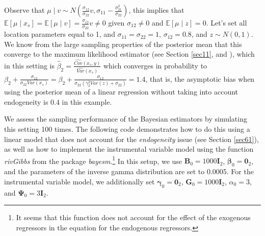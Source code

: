 Observe that $\mu\mid v\sim N\left(\frac{\sigma_{12}}{\sigma_{22}}v,\sigma_{11}-\frac{\sigma_{21}^2}{\sigma_{22}}\right)$, this implies that $\mathbb{E}[\mu\mid x_s]=\mathbb{E}[\mu\mid v]=\frac{\sigma_{12}}{\sigma_{22}}v\neq 0$ given $\sigma_{12}\neq 0$ and $\mathbb{E}[\mu\mid z]=0$.
Let's set all location parameters equal to 1, and $\sigma_{11}=\sigma_{22}=1$, $\sigma_{12}=0.8$, and $z\sim N(0,1)$. We know from the large sampling properties of the posterior mean that this converge to the maximum likelihood estimator (see Section \ref{sec11}, and \cite{Lehmann2003,van2000asymptotic}), which in this setting is $\hat{\beta}_2=\frac{\widehat{Cov}(x_s,y)}{\widehat{Var}(x_s)}$ which converges in probability to $\beta_2+\frac{\sigma_{12}}{\sigma_{22}Var(x_s)}=\beta_2+\frac{\sigma_{12}}{\sigma_{22}(\gamma_2^2Var(z)+\sigma_{22})}=1.4$, that is, the asymptotic bias when using the posterior mean of a linear regression without taking into account endogeneity is 0.4 in this example.

We assess the sampling performance of the Bayesian estimators by simulating this setting 100 times. The following code demonstrates how to do this using a linear model that does not account for the \textit{endogeneity} issue (see Section \ref{sec61}), as well as how to implement the instrumental variable model using the function \textit{rivGibbs} from the package \textit{bayesm}.\footnote{It seems that this function does not account for the effect of the exogenous regressors in the equation for the endogenous regressors.} In this setup, we use \( \bm{B}_0 = 1000 \bm{I}_2 \), \( \bm{\beta}_0 = \bm{0}_2 \), and the parameters of the inverse gamma distribution are set to 0.0005. For the instrumental variable model, we additionally set \( \bm{\gamma}_0 = \bm{0}_2 \), \( \bm{G}_0 = 1000 \bm{I}_2 \), \( \alpha_0 = 3 \), and \( \bm{\Psi}_0 = 3 \bm{I}_2 \).

